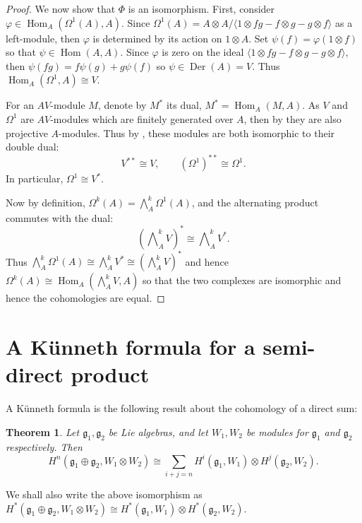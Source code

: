 \documentclass[12pt]{amsart}
\newcommand{\g}{{\mathfrak{g}}}
\newcommand{\Der}{{\operatorname{Der}}}
\newcommand{\Hom}{{\operatorname{Hom}}}
\newcommand{\vphi}{{\varphi}}
\newtheorem{theorem}{Theorem}[section]
\theoremstyle{definition}
\begin{document}
\begin{proof}
We now show that $\Phi$ is an isomorphism. First, consider $\vphi \in \Hom_A(\Omega^1(A), A)$. Since $\Omega^1(A) = A \otimes A / \langle 1 \otimes fg - f \otimes g - g \otimes f \rangle$ as a left-module, then $\vphi$ is determined by its action on $1 \otimes A$. Set $\psi(f) = \vphi(1 \otimes f)$ so that $\psi \in \Hom(A, A)$. Since $\vphi $ is zero on the ideal $\langle 1 \otimes fg - f \otimes g - g \otimes f \rangle$, then $\psi(fg) = f \psi(g) + g \psi(f)$ so $\psi \in \Der(A) = V$. Thus $\Hom_A(\Omega^1, A) \cong V$.

For an $AV$-module $M$, denote by $M^*$ its dual, $M^* = \Hom_A(M, A)$.
 As $V$ and $\Omega^1$ are $AV$-modules which are finitely generated over $A$, then by \cite[Proposition 1.2]{BouazizRocha} they are also projective $A$-modules. Thus by \cite{BourbakiAlgebra}, these modules are both isomorphic to their double dual:
\[
V^{**} \cong V, \quad\quad (\Omega^1)^{**} \cong \Omega^1.
\]
In particular, $\Omega^1 \cong V^*$.

Now by definition, $\Omega^k(A) = \bigwedge^k_A \Omega^1(A)$,
and the alternating product commutes with the dual:
\[
\left( \bigwedge\nolimits^k_A V \right)^* \cong \bigwedge\nolimits^k_A V^*.
\]
Thus $\bigwedge^k_A \Omega^1(A) \cong \bigwedge^k_A V^* \cong \left( \bigwedge^k_A V\right)^*$ and hence $\Omega^k(A) \cong \Hom_A(\bigwedge^k_A V, A)$ so that the two complexes are isomorphic and hence the cohomologies are equal. 
\end{proof}

\section{A K\"unneth formula for a semi-direct product}\label{section:Kunneth}

A K\"unneth formula is the following result about the cohomology of a direct sum:

\begin{theorem}
\label{direct_sum_Kunneth}
Let $\g_1, \g_2$ be Lie algebras, and let $W_1, W_2$ be modules for $\g_1$ and $\g_2$ respectively. Then 
\[
 H^n(\g_1 \oplus \g_2, W_1 \otimes W_2) \cong \sum_{i+j=n} H^i(\g_1, W_1) \otimes H^{j}(\g_2, W_2).
\]
\end{theorem}

We shall also write the above isomorphism as 
$H^*(\g_1 \oplus \g_2, W_1 \otimes W_2) \cong  
H^*(\g_1, W_1) \otimes H^*(\g_2, W_2)$.
\end{document}
